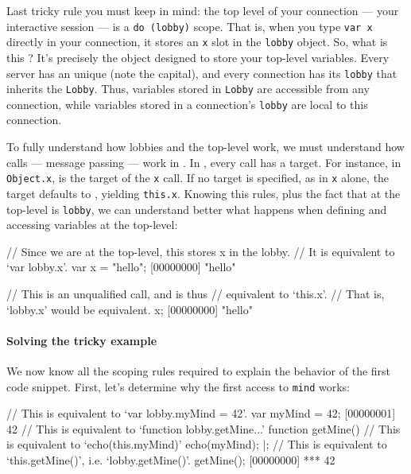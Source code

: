 Last tricky rule you must keep in mind: the top level of your connection ---
your interactive session --- is a %
\lstinline|do (lobby)| scope. That is, when you type \lstinline|var x|
directly in your connection, it stores an \lstinline|x| slot in the
\lstinline|lobby| object. So, what is this ? It's precisely the
object designed to store your top-level variables. Every \urbi server has an
unique  (note the capital), and every connection has its
\lstinline|lobby| that inherits the \lstinline|Lobby|. Thus, variables
stored in \lstinline|Lobby| are accessible from any connection, while
variables stored in a connection's \lstinline|lobby| are local to this
connection.

To fully understand how lobbies and the top-level work, we must
understand how calls --- message passing --- work in \us.  In \us,
every call has a target. For instance, in \lstinline|Object.x|,
 is the target of the \lstinline|x| call. If no
target is specified, as in \lstinline|x| alone, the target defaults to
\this, yielding \lstinline|this.x|. Knowing this rules,
plus the fact that at the top-level \this is
\lstinline|lobby|, we can understand better what happens when defining
and accessing variables at the top-level:

\begin{urbiscript}
// Since we are at the top-level, this stores x in the lobby.
// It is equivalent to `var lobby.x'.
var x = "hello";
[00000000] "hello"

// This is an unqualified call, and is thus
// equivalent to `this.x'.
// That is, `lobby.x' would be equivalent.
x;
[00000000] "hello"
\end{urbiscript}

\paragraph{Solving the tricky example}
We now know all the scoping rules required to explain the behavior of
the first code snippet. First, let's determine why the first access to
\lstinline|mind| works:

\begin{urbiscript}
// This is equivalent to `var lobby.myMind = 42'.
var myMind = 42;
[00000001] 42
// This is equivalent to `function lobby.getMine...'
function getMine()
{
  // This is equivalent to `echo(this.myMind)'
  echo(myMind);
}|;
// This is equivalent to `this.getMine()', i.e. `lobby.getMine()'.
getMine();
[00000000] *** 42
\end{urbiscript}

